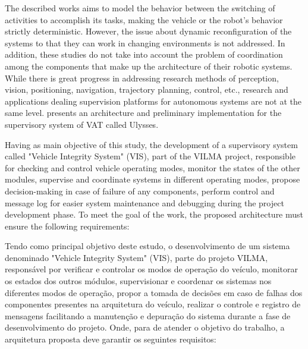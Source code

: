 \documentclass[conference]{IEEEtran}
\begin{document}
The described works aims to model the behavior between the switching of activities to accomplish its tasks, making the vehicle or the robot's behavior strictly deterministic. However, the issue about dynamic reconfiguration of the systems to that they can work in changing environments is not addressed. In addition, these studies do not take into account the problem of coordination among the components that make up the architecture of their robotic systems. While there is great progress in addressing research methods of perception, vision, positioning, navigation, trajectory planning, control, etc., research and applications dealing supervision platforms for autonomous systems are not at the same level. \cite{event_supervisory_land_1157827} presents an architecture and preliminary implementation for the supervisory system of VAT called Ulysses.


Having as main objective of this study, the development of a supervisory system called "Vehicle Integrity System" (VIS), part of the VILMA project, responsible for checking and control vehicle operating modes, monitor the states of the other modules, supervise and coordinate systems in different operating modes, propose decision-making in case of failure of any components, perform control and message log for easier system maintenance and debugging during the project development phase. To meet the goal of the work, the proposed architecture must ensure the following requirements:


Tendo como principal objetivo deste estudo, o desenvolvimento de um sistema denominado "Vehicle Integrity System" (VIS), parte do projeto VILMA, responsável por verificar e controlar os modos de operação do veículo, monitorar os estados dos outros módulos, supervisionar e coordenar os sistemas nos diferentes modos de operação, propor a tomada de decisões em caso de falhas dos componentes presentes na arquitetura do veículo, realizar o controle e registro de mensagens facilitando a manutenção e depuração do sistema durante a fase de desenvolvimento do projeto. Onde, para de atender o objetivo do trabalho, a arquitetura proposta deve garantir os seguintes requisitos:
\end{document}
